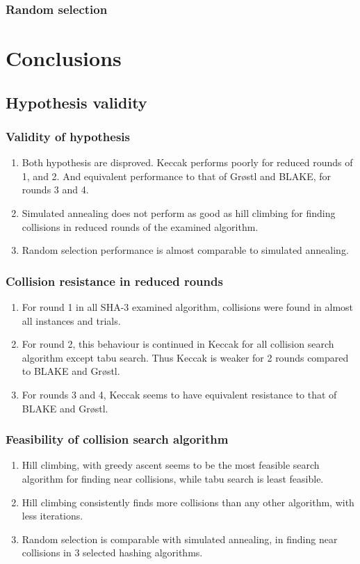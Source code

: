 \documentclass{beamer}
\begin{document}
\begin{frame}
\frametitle{Random selection}
\end{frame}

\section{Conclusions}

\subsection{Hypothesis validity}

\begin{frame}
\frametitle{Validity of hypothesis}
\begin{enumerate}
\item Both hypothesis are disproved. Keccak performs poorly for reduced rounds of 1, and 2. And
equivalent performance to that of Gr{\o}stl and BLAKE, for rounds 3 and 4.
\item Simulated annealing does not perform as good as hill climbing for finding collisions in
reduced rounds of the examined algorithm.
\item Random selection performance is almost comparable to simulated annealing.
\end{enumerate}
\end{frame}

\begin{frame}
\frametitle{Collision resistance in reduced rounds}
\begin{enumerate}
\item For round 1 in all SHA-3 examined algorithm, collisions were found in almost all instances and
trials.
\item For round 2, this behaviour is continued in Keccak for all collision search algorithm except tabu
search. Thus Keccak is weaker for 2 rounds compared to BLAKE and Gr{\o}stl.
\item For rounds 3 and 4, Keccak seems to have equivalent resistance to that of BLAKE and Gr{\o}stl.
\end{enumerate}
\end{frame}

\begin{frame}
\frametitle{Feasibility of collision search algorithm}
\begin{enumerate}
\item Hill climbing, with greedy ascent seems to be the most feasible search algorithm for finding near
collisions, while tabu search is least feasible.
\item Hill climbing consistently finds more collisions than any other algorithm, with less iterations.
\item Random selection is comparable with simulated annealing, in finding near collisions in 3 selected
hashing algorithms.
\end{enumerate}
\end{frame}
\end{document}
